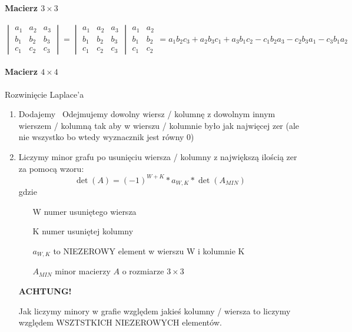 \documentclass[a4paper,12pt]{article}
\theoremstyle{definition}%
\theoremstyle{definition}
\theoremstyle{problem}
\begin{document}
\paragraph{Macierz $3\times 3$}
$$\begin{vmatrix}
a_1&a_2&a_3\\
b_1&b_2&b_3\\
c_1&c_2&c_3
\end{vmatrix}=\begin{vmatrix}
a_1&a_2&a_3\\
b_1&b_2&b_3\\
c_1&c_2&c_3
\end{vmatrix}\begin{matrix}
a_1&a_2\\
b_1&b_2\\
c_1&c_2
\end{matrix}=a_1b_2c_3+a_2b_3c_1+a_3b_1c_2-c_1b_2a_3-c_2b_3a_1-c_3b_1a_2$$

\paragraph{Macierz $4\times 4$}
Rozwinięcie Laplace'a
\begin{enumerate}
\item Dodajemy \ Odejmujemy dowolny wiersz / kolumnę z dowolnym innym wierszem / kolumną tak aby w wierszu / kolumnie było jak najwięcej zer (ale nie wszystko bo wtedy wyznacznik jest równy 0)
\item Liczymy minor grafu po usunięciu wiersza / kolumny z największą ilością zer za pomocą wzoru:
$$\det (A)=(-1)^{W+K}*a_{W,K}*\det (A_{MIN})$$ gdzie 
\begin{itemize}
\item[W] numer usuniętego wiersza 
\item[K] numer usuniętej kolumny
\item[$a_{W,K}$] to NIEZEROWY element w wierszu W i kolumnie K
\item[$A_{MIN}$] minor macierzy $A$ o rozmiarze $3\times 3$ 
\end{itemize}
\textbf{ACHTUNG!}

Jak liczymy minory w grafie względem jakieś kolumny / wiersza to liczymy względem WSZTSTKICH NIEZEROWYCH elementów.
\end{enumerate}
\end{document}
